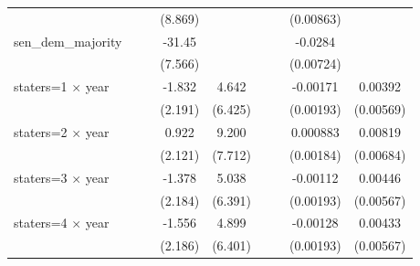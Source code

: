 {\begin{longtable}{l*{8}{c}}
                    &                     &                     &     (8.869)         &                     &                     &                     &   (0.00863)         &                     \\
[1em]
sen\_dem\_majority    &                     &                     &      -31.45\sym{***}&                     &                     &                     &     -0.0284\sym{***}&                     \\
                    &                     &                     &     (7.566)         &                     &                     &                     &   (0.00724)         &                     \\
[1em]
staters=1 $\times$ year&                     &                     &      -1.832         &       4.642         &                     &                     &    -0.00171         &     0.00392         \\
                    &                     &                     &     (2.191)         &     (6.425)         &                     &                     &   (0.00193)         &   (0.00569)         \\
[1em]
staters=2 $\times$ year&                     &                     &       0.922         &       9.200         &                     &                     &    0.000883         &     0.00819         \\
                    &                     &                     &     (2.121)         &     (7.712)         &                     &                     &   (0.00184)         &   (0.00684)         \\
[1em]
staters=3 $\times$ year&                     &                     &      -1.378         &       5.038         &                     &                     &    -0.00112         &     0.00446         \\
                    &                     &                     &     (2.184)         &     (6.391)         &                     &                     &   (0.00193)         &   (0.00567)         \\
[1em]
staters=4 $\times$ year&                     &                     &      -1.556         &       4.899         &                     &                     &    -0.00128         &     0.00433         \\
                    &                     &                     &     (2.186)         &     (6.401)         &                     &                     &   (0.00193)         &   (0.00567)         \\

\end{longtable}}

